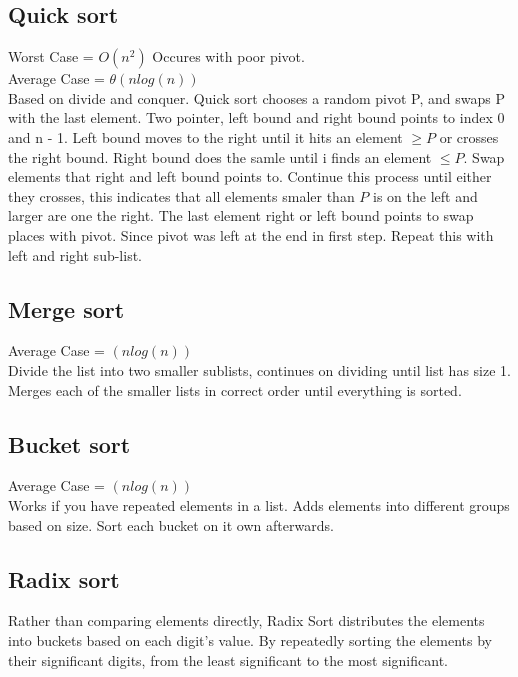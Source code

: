 \documentclass{article}
\begin{document}
\subsection{Quick sort}
Worst Case = $O(n^2)$ Occures with poor pivot.\\ 
Average Case = $\theta(nlog(n))$\\
Based on divide and conquer. Quick sort chooses a random pivot P, and swaps P with the last element. Two pointer, left bound and right bound points to index 0 and n - 1.
Left bound moves to the right until it hits an element $\geq P$ or crosses the right bound. Right bound does the samle until i finds an element $\leq P$. 
Swap elements that right and left bound points to. Continue this process until either they crosses, this indicates that all elements smaler than $P$ is on the left and larger are one the right.
The last element right or left bound points to swap places with pivot. Since pivot was left at the end in first step. 
Repeat this with left and right sub-list.  
\subsection{Merge sort}
Average Case = $(nlog(n))$\\
Divide the list into two smaller sublists, continues on dividing until list has size 1. Merges each of the smaller lists in correct order until everything is sorted. 
\subsection{Bucket sort}
Average Case = $(nlog(n))$\\
Works if you have repeated elements in a list. Adds elements into different groups based on size. Sort each bucket on it own afterwards. 

\subsection{Radix sort}
Rather than comparing elements directly, Radix Sort distributes the elements into buckets based on each digit’s value. 
By repeatedly sorting the elements by their significant digits, from the least significant to the most significant.

\newpage
\end{document}
